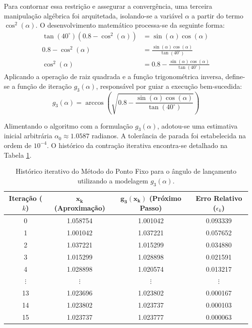Para contornar essa restrição e assegurar a convergência, uma terceira manipulação algébrica foi arquitetada, isolando-se a variável $\alpha$ a partir do termo $\cos^2(\alpha)$. O desenvolvimento matemático processa-se da seguinte forma:
\begin{align}
    \tan(40^\circ)\left(0.8 - \cos^2(\alpha)\right) &= \sin(\alpha)\cos(\alpha) \nonumber \\
    0.8 - \cos^2(\alpha) &= \frac{\sin(\alpha)\cos(\alpha)}{\tan(40^\circ)} \nonumber \\
    \cos^2(\alpha) &= 0.8 - \frac{\sin(\alpha)\cos(\alpha)}{\tan(40^\circ)}
\end{align}
Aplicando a operação de raiz quadrada e a função trigonométrica inversa, define-se a função de iteração $g_3(\alpha)$, responsável por guiar a execução bem-sucedida:
\begin{equation}
    g_3(\alpha) = \arccos\left(\sqrt{0.8 - \frac{\sin(\alpha)\cos(\alpha)}{\tan(40^\circ)}}\right)
    \label{eq:g3_ponto_fixo_missil}
\end{equation}

Alimentando o algoritmo com a formulação $g_3(\alpha)$, adotou-se uma estimativa inicial arbitrária $\alpha_0 \approx 1.0587$ radianos. A tolerância de parada foi estabelecida na ordem de $10^{-4}$. O histórico da contração iterativa encontra-se detalhado na Tabela \ref{tab:ponto_fixo_missil_g3}.

\begin{table}[htpb]
\centering
\caption{Histórico iterativo do Método do Ponto Fixo para o ângulo de lançamento utilizando a modelagem $g_3(\alpha)$.}
\label{tab:ponto_fixo_missil_g3}
\small
\begin{tabular}{@{}cccc@{}}
\toprule
\textbf{Iteração ($k$)} & $\mathbf{x_k}$ (Aproximação) & $\mathbf{g_3(x_k)}$ (Próximo Passo) & \textbf{Erro Relativo} ($\epsilon_k$) \\ \midrule
0  & 1.058754 & 1.001042 & 0.093339 \\
1  & 1.001042 & 1.037221 & 0.057652 \\
2  & 1.037221 & 1.015299 & 0.034880 \\
3  & 1.015299 & 1.028898 & 0.021591 \\
4  & 1.028898 & 1.020574 & 0.013217 \\
$\vdots$ & $\vdots$ & $\vdots$ & $\vdots$ \\
13 & 1.023696 & 1.023802 & 0.000167 \\
14 & 1.023802 & 1.023737 & 0.000103 \\
15 & 1.023737 & 1.023777 & 0.000063 \\ \bottomrule
\end{tabular}
\end{table}

